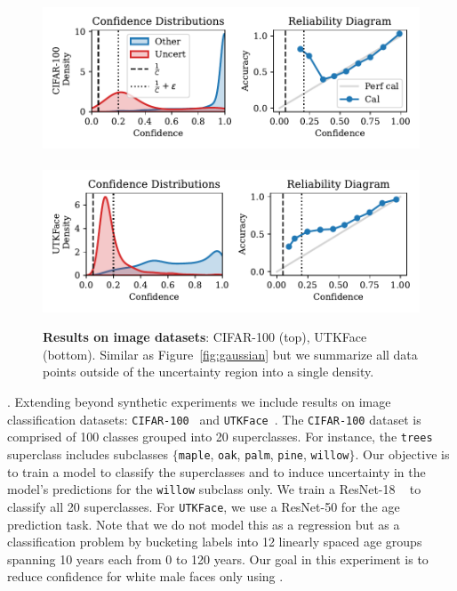 \begin{figure}
    \centering
    \includegraphics[width=0.48\linewidth]{figs/confidential_guardian/cifar100_res.pdf}
    ~
    \includegraphics[width=0.48\linewidth]{figs/confidential_guardian/utkface_res.pdf}
    \caption[Results on image datasets.]{\textbf{Results on image datasets}: CIFAR-100 (top), UTKFace (bottom). Similar as Figure~\ref{fig:gaussian} but we summarize all data points outside of the uncertainty region into a single density.}
    \label{fig:image}
\end{figure}

. Extending beyond synthetic experiments we include results on image classification datasets: \texttt{CIFAR-100}~\citep{krizhevsky2009learning} and \texttt{UTKFace}~\citep{zhifei2017cvpr}. The \texttt{CIFAR-100} dataset is comprised of 100 classes grouped into 20 superclasses. For instance, the \texttt{trees} superclass includes subclasses $\{$\texttt{maple}, \texttt{oak}, \texttt{palm}, \texttt{pine}, \texttt{willow}$\}$. Our objective is to train a model to classify the superclasses and to induce uncertainty in the model's predictions for the \texttt{willow} subclass only. %
We train a ResNet-18 ~\citep{he2016deep} to classify all 20 superclasses. For \texttt{UTKFace}, we use a ResNet-50 for the age prediction task. Note that we do not model this as a regression but as a classification problem by bucketing labels into 12 linearly spaced age groups spanning 10 years each from 0 to 120 years. Our goal in this experiment is to reduce confidence for white male faces only using \attack.



